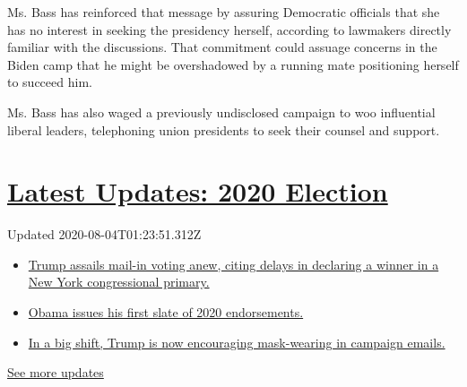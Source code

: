 Ms. Bass has reinforced that message by assuring Democratic officials
that she has no interest in seeking the presidency herself, according to
lawmakers directly familiar with the discussions. That commitment could
assuage concerns in the Biden camp that he might be overshadowed by a
running mate positioning herself to succeed him.

Ms. Bass has also waged a previously undisclosed campaign to woo
influential liberal leaders, telephoning union presidents to seek their
counsel and support.

\hypertarget{latest-updates-2020-election}{%
\section{\texorpdfstring{\href{https://www.nytimes3xbfgragh.onion/2020/08/03/us/elections/biden-vs-trump.html?action=click\&pgtype=Article\&state=default\&region=MAIN_CONTENT_1\&context=storylines_live_updates}{Latest
Updates: 2020
Election}}{Latest Updates: 2020 Election}}\label{latest-updates-2020-election}}

Updated 2020-08-04T01:23:51.312Z

\begin{itemize}
\tightlist
\item
  \href{https://www.nytimes3xbfgragh.onion/2020/08/03/us/elections/biden-vs-trump.html?action=click\&pgtype=Article\&state=default\&region=MAIN_CONTENT_1\&context=storylines_live_updates\#link-6494b448}{Trump
  assails mail-in voting anew, citing delays in declaring a winner in a
  New York congressional primary.}
\item
  \href{https://www.nytimes3xbfgragh.onion/2020/08/03/us/elections/biden-vs-trump.html?action=click\&pgtype=Article\&state=default\&region=MAIN_CONTENT_1\&context=storylines_live_updates\#link-3de249e6}{Obama
  issues his first slate of 2020 endorsements.}
\item
  \href{https://www.nytimes3xbfgragh.onion/2020/08/03/us/elections/biden-vs-trump.html?action=click\&pgtype=Article\&state=default\&region=MAIN_CONTENT_1\&context=storylines_live_updates\#link-54e34d20}{In
  a big shift, Trump is now encouraging mask-wearing in campaign
  emails.}
\end{itemize}

\href{https://www.nytimes3xbfgragh.onion/2020/08/03/us/elections/biden-vs-trump.html?action=click\&pgtype=Article\&state=default\&region=MAIN_CONTENT_1\&context=storylines_live_updates}{See
more updates}

